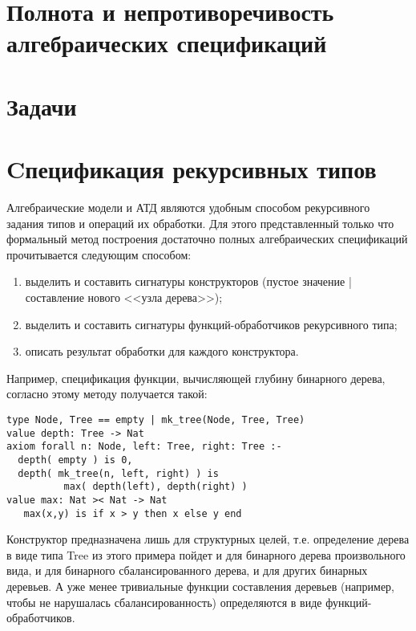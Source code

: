 \documentclass[14pt, twoside]{extreport}
\newcounter{problem_type}[chapter]
\newcommand{\head}[1]{\vspace{1cm}\subsubsection*{#1}}
\begin{document}








\section{Полнота и непротиворечивость алгебраических спецификаций}



\section*{Задачи}



\section{Cпецификация рекурсивных типов}

Алгебраические модели и АТД являются удобным способом рекурсивного задания типов и операций их обработки. Для этого представленный только что формальный метод построения достаточно полных алгебраических спецификаций прочитывается следующим способом:
\begin{enumerate}
  \item выделить и составить сигнатуры конструкторов (пустое значение | составление нового <<узла дерева>>);
  \item выделить и составить сигнатуры функций-обработчиков рекурсивного типа;
  \item описать результат обработки для каждого конструктора.
\end{enumerate}

Например, спецификация функции, вычисляющей глубину бинарного дерева, согласно этому методу получается такой:
\begin{lstlisting}
type Node, Tree == empty | mk_tree(Node, Tree, Tree)
value depth: Tree -> Nat
axiom forall n: Node, left: Tree, right: Tree :-
  depth( empty ) is 0,
  depth( mk_tree(n, left, right) ) is
          max( depth(left), depth(right) )
value max: Nat >< Nat -> Nat
   max(x,y) is if x > y then x else y end
\end{lstlisting}

Конструктор предназначена лишь для структурных целей, т.е. определение дерева в виде типа Tree из этого примера пойдет и для бинарного дерева произвольного вида, и для бинарного сбалансированного дерева, и для других бинарных деревьев. А уже менее тривиальные функции составления деревьев (например, чтобы не нарушалась сбалансированность) определяются в виде функций-обработчиков.
\end{document}
